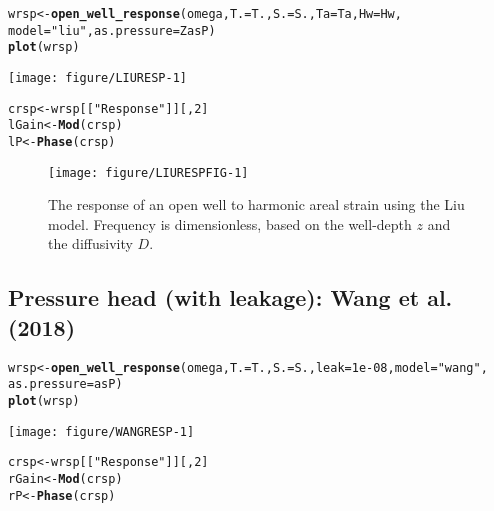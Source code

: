 \documentclass[12pt]{article}\usepackage[]{graphicx}\usepackage[]{xcolor}
\makeatletter
\def\maxwidth{ %
  \ifdim\Gin@nat@width>\linewidth
    \linewidth
  \else
    \Gin@nat@width
  \fi
}
\newcommand{\hlnum}[1]{\textcolor[rgb]{0.686,0.059,0.569}{#1}}%
\newcommand{\hlsng}[1]{\textcolor[rgb]{0.192,0.494,0.8}{#1}}%
\newcommand{\hldef}[1]{\textcolor[rgb]{0.345,0.345,0.345}{#1}}%
\newcommand{\hlkwb}[1]{\textcolor[rgb]{0.69,0.353,0.396}{#1}}%
\newcommand{\hlkwc}[1]{\textcolor[rgb]{0.333,0.667,0.333}{#1}}%
\newcommand{\hlkwd}[1]{\textcolor[rgb]{0.737,0.353,0.396}{\textbf{#1}}}%
\newenvironment{kframe}{%
 \def\at@end@of@kframe{}%
 \ifinner\ifhmode%
  \def\at@end@of@kframe{\end{minipage}}%
  \begin{minipage}{\columnwidth}%
 \fi\fi%
 \def\FrameCommand##1{\hskip\@totalleftmargin \hskip-\fboxsep
 \colorbox{shadecolor}{##1}\hskip-\fboxsep
     \hskip-\linewidth \hskip-\@totalleftmargin \hskip\columnwidth}%
 \MakeFramed {\advance\hsize-\width
   \@totalleftmargin\z@ \linewidth\hsize
   \@setminipage}}%
 {\par\unskip\endMakeFramed%
 \at@end@of@kframe}
\newenvironment{knitrout}{}{} %
\makeatother
\begin{document}
\begin{knitrout}\small
{}\color{fgcolor}\begin{kframe}
\begin{alltt}
\hldef{wrsp} \hlkwb{<-} \hlkwd{open_well_response}\hldef{(omega,} \hlkwc{T.} \hldef{= T.,} \hlkwc{S.} \hldef{= S.,} \hlkwc{Ta} \hldef{= Ta,} \hlkwc{Hw} \hldef{= Hw,}
    \hlkwc{model} \hldef{=} \hlsng{"liu"}\hldef{,} \hlkwc{as.pressure} \hldef{= ZasP)}
\hlkwd{plot}\hldef{(wrsp)}
\end{alltt}
\end{kframe}
\texttt{[image: figure/LIURESP-1]} 
\begin{kframe}\begin{alltt}
\hldef{crsp} \hlkwb{<-} \hldef{wrsp[[}\hlsng{"Response"}\hldef{]][,} \hlnum{2}\hldef{]}
\hldef{lGain} \hlkwb{<-} \hlkwd{Mod}\hldef{(crsp)}
\hldef{lP} \hlkwb{<-} \hlkwd{Phase}\hldef{(crsp)}
\end{alltt}
\end{kframe}
\end{knitrout}

\begin{figure}[htb!]
\begin{center}
\begin{knitrout}\small
{}\color{fgcolor}
\texttt{[image: figure/LIURESPFIG-1]} 
\end{knitrout}
\caption{The response of an open well to harmonic areal strain using
the Liu model. 
Frequency is dimensionless, based on the well-depth $z$ and the diffusivity $D$.
}
\label{fig:owrsp-liu}
\end{center}
\end{figure}



\clearpage
\subsection{Pressure head (with leakage): Wang et al. (2018)}

\begin{knitrout}\small
{}\color{fgcolor}\begin{kframe}
\begin{alltt}
\hldef{wrsp} \hlkwb{<-} \hlkwd{open_well_response}\hldef{(omega,} \hlkwc{T.} \hldef{= T.,} \hlkwc{S.} \hldef{= S.,} \hlkwc{leak} \hldef{=} \hlnum{1e-08}\hldef{,} \hlkwc{model} \hldef{=} \hlsng{"wang"}\hldef{,}
    \hlkwc{as.pressure} \hldef{= asP)}
\hlkwd{plot}\hldef{(wrsp)}
\end{alltt}
\end{kframe}
\texttt{[image: figure/WANGRESP-1]} 
\begin{kframe}\begin{alltt}
\hldef{crsp} \hlkwb{<-} \hldef{wrsp[[}\hlsng{"Response"}\hldef{]][,} \hlnum{2}\hldef{]}
\hldef{rGain} \hlkwb{<-} \hlkwd{Mod}\hldef{(crsp)}
\hldef{rP} \hlkwb{<-} \hlkwd{Phase}\hldef{(crsp)}
\end{alltt}
\end{kframe}
\end{knitrout}
\end{document}
